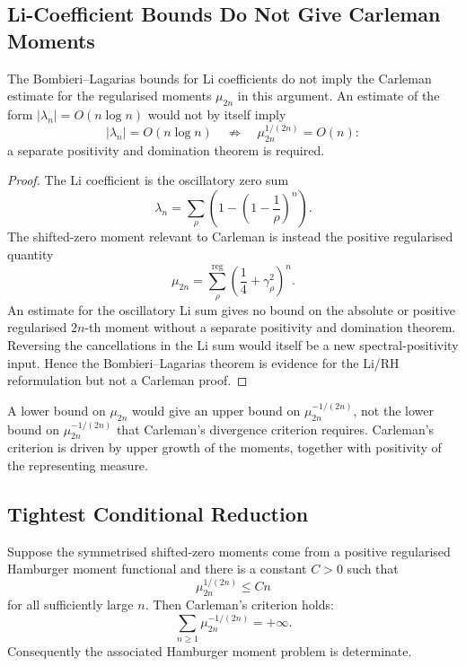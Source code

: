 \subsection{Li-Coefficient Bounds Do Not Give Carleman Moments}
\label{v4-arith:hpar-det:carleman-BL}

\begin{proposition}
\label{v4-arith:hpar-det:prop:BL-carleman-partial}
The Bombieri--Lagarias bounds for Li
coefficients do not imply the Carleman estimate for the
regularised moments \(\mu_{2n}\) in this argument.
An estimate of the form \(|\lambda_n| = O(n\log n)\)
would not by itself imply
\[
 |\lambda_{n}|=O(n\log n)
 \quad\not\Longrightarrow\quad
 \mu_{2n}^{1/(2n)}=O(n):
\]
a separate positivity and domination theorem is required.
\end{proposition}

\begin{proof}
The Li coefficient is the oscillatory zero sum
\[
 \lambda_{n}=\sum_{\rho}\left(1-\left(1-\frac1{\rho}\right)^{n}\right).
\]
The shifted-zero moment relevant to Carleman is instead the positive
regularised quantity
\[
 \mu_{2n}=\sum_{\rho}^{\mathrm{reg}}\left(\frac14+\gamma_{\rho}^{2}\right)^{n}.
\]
An estimate for the oscillatory Li sum gives no bound on the absolute
or positive regularised \(2n\)-th moment without a separate positivity
and domination theorem. Reversing the cancellations in the Li sum
would itself be a new spectral-positivity input. Hence the
Bombieri--Lagarias theorem is evidence for the Li/RH reformulation but
not a Carleman proof.
\end{proof}

\begin{remark}
\label{v4-arith:hpar-det:rem:carleman-not-decided}
A lower bound on
\(\mu_{2n}\) would give an upper bound on
\(\mu_{2n}^{-1/(2n)}\), not the lower bound on
\(\mu_{2n}^{-1/(2n)}\) that Carleman's divergence criterion requires.
Carleman's criterion is driven by upper growth of the
moments, together with positivity of the representing measure.
\end{remark}

\subsection{Tightest Conditional Reduction}
\label{v4-arith:hpar-det:tightest-reduction}

\begin{theorem}
\label{v4-arith:hpar-det:thm:carleman-reformulation}
Suppose the symmetrised shifted-zero moments
come from a positive regularised Hamburger moment functional and
there is a constant \(C>0\) such that
\begin{equation}
\label{v4-arith:hpar-det:eq:sharp-asymptotic}
 \mu_{2n}^{1/(2n)}\le Cn
\end{equation}
for all sufficiently large \(n\). Then Carleman's criterion holds:
\[
 \sum_{n\ge1}\mu_{2n}^{-1/(2n)}=+\infty.
\]
Consequently the associated Hamburger moment problem is determinate.
\end{theorem}

